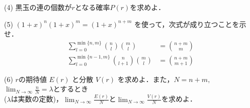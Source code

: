 \documentclass[a4j]{jarticle}
\let \ds \displaystyle
\begin{document}
\begin{screen}
 (4) 黒玉の連の個数が$r$となる確率$P(r)$を求めよ．
\end{screen}

\begin{screen}
 (5) $(1+x)^n(1+x)^m = (1+x)^{n+m}$ を使って，次式が成り立つことを示せ．
 \begin{align*}
  \sum_{l=0}^{\min\{n,m\}}\binom{n}{l}\binom{m}{l} &= \binom{n+m}{m} \tag{3.1} \\
  \sum_{l=0}^{\min\{n-1,m\}} \binom{n}{l+1}\binom{m}{l} &= \binom{n+m}{m+1} \tag{3.2}
 \end{align*}
\end{screen}

\begin{screen}
 (6) $r$の期待値 $E(r)$ と分散 $V(r)$ を求めよ．また，$N=n+m,$ $\ds \lim_{N \rightarrow \infty}\frac{n}{N} = \lambda$とするとき \\ ($\lambda$は実数の定数)，$\ds \lim_{N \rightarrow \infty}\frac{E(r)}{N}$と$\ds \lim_{N \rightarrow \infty}\frac{V(r)}{N}$を求めよ．

\end{screen}
\end{document}
